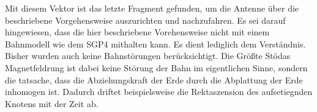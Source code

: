 Mit diesem Vektor ist das letzte Fragment gefunden, um die Antenne über die beschriebene Vorgehensweise auszurichten und nachzufahren. Es sei darauf hingewiesen, dass die hier beschriebene Vorehensweise nicht mit einem Bahnmodell wie dem \ac{SGP4} mithalten kann. Es dient lediglich dem Verständnis. Bisher wurden auch keine Bahnstörungen berücksichtigt. Die Größte Stödas Magnetfeldrung ist dabei keine Störung der Bahn im eigentlichen Sinne, sondern die tatsache, dass die Abziehungskraft der Erde durch die Abplattung der Erde inhomogen ist. Dadurch driftet beispielsweise die Rektaszension des aufsetiegnden Knotens mit der Zeit ab.      

